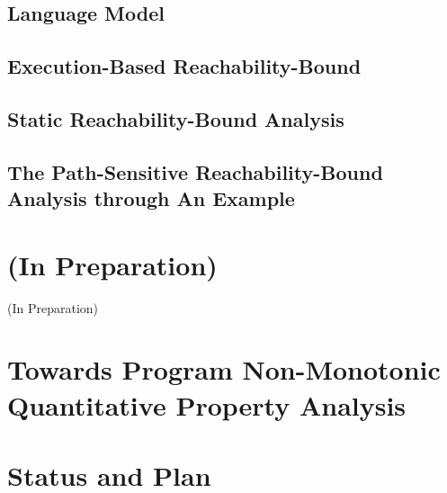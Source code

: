 \documentclass[a4paper,11pt]{article}
\begin{document}
\subsection{{Language Model}}
\label{sec:reachability-language}

\subsection{{Execution-Based Reachability-Bound}}
\label{sec:reachability-exe}

\subsection{{Static Reachability-Bound Analysis}}
\label{sec:reachability-static}


\subsection{The Path-Sensitive Reachability-Bound Analysis through An Example}
\label{sec:reachability-example}


\section*{(In Preparation)}
{\protect\numberline{}(In Preparation)}%

\section{Towards Program Non-Monotonic Quantitative Property Analysis }
\label{sec:generalization}


% 

\section{Status and Plan }
\label{sec:status-plan}




\end{document}
